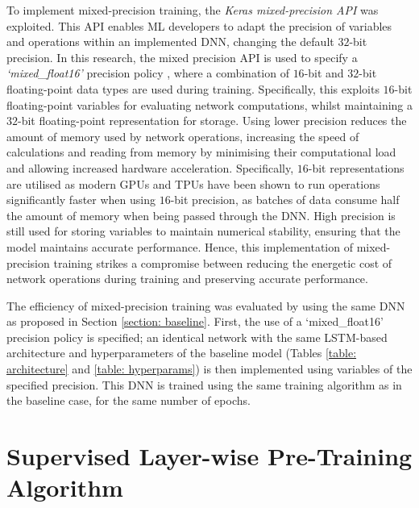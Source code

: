 \documentclass[a4paper, 11pt]{report}
\begin{document}
    To implement mixed-precision training, the \emph{Keras mixed-precision API} \citep{abadi-2016} was exploited. This API enables ML developers to adapt the precision of variables and operations within an implemented DNN, changing the default $32$-bit precision. In this research, the mixed precision API is used to specify a \emph{`mixed\_float16'} precision policy \citep{abadi-2016}, where a combination of $16$-bit and $32$-bit floating-point data types are used during training. Specifically, this exploits $16$-bit floating-point variables for evaluating network computations, whilst maintaining a $32$-bit floating-point representation for storage. Using lower precision reduces the amount of memory used by network operations, increasing the speed of calculations and reading from memory by minimising their computational load and allowing increased hardware acceleration. Specifically, $16$-bit representations are utilised as modern GPUs and TPUs have been shown to run operations significantly faster when using $16$-bit precision, as batches of data consume half the amount of memory when being passed through the DNN. High precision is still used for storing variables to maintain numerical stability, ensuring that the model maintains accurate performance. Hence, this implementation of mixed-precision training strikes a compromise between reducing the energetic cost of network operations during training and preserving accurate performance.

    The efficiency of mixed-precision training was evaluated by using the same DNN as proposed in Section \ref{section: baseline}. First, the use of a `mixed\_float16' precision policy is specified; an identical network with the same LSTM-based architecture and hyperparameters of the baseline model (Tables \ref{table: architecture} and \ref{table: hyperparams}) is then implemented using variables of the specified precision. This DNN is trained using the same training algorithm as in the baseline case, for the same number of epochs.


    \section{Supervised Layer-wise Pre-Training Algorithm}
\end{document}
